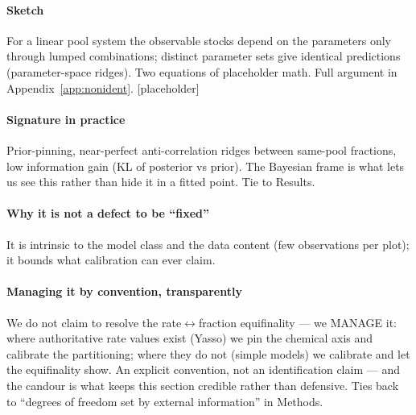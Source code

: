 \documentclass[11pt]{article}
\begin{document}
\paragraph{Sketch}
For a linear pool system the observable stocks depend on the parameters only
through lumped combinations; distinct parameter sets give identical
predictions (parameter-space ridges). Two equations of placeholder math.
Full argument in Appendix~\ref{app:nonident}. [placeholder]

\paragraph{Signature in practice}
Prior-pinning, near-perfect anti-correlation ridges between same-pool
fractions, low information gain (KL of posterior vs prior). The Bayesian frame
is what lets us see this rather than hide it in a fitted point. Tie to Results.

\paragraph{Why it is not a defect to be ``fixed''}
It is intrinsic to the model class and the data content (few observations per
plot); it bounds what calibration can ever claim.

\paragraph{Managing it by convention, transparently}
We do not claim to resolve the rate$\leftrightarrow$fraction equifinality --- we
MANAGE it: where authoritative rate values exist (Yasso) we pin the chemical axis
and calibrate the partitioning; where they do not (simple models) we calibrate and
let the equifinality show. An explicit convention, not an identification claim ---
and the candour is what keeps this section credible rather than defensive. Ties
back to ``degrees of freedom set by external information'' in Methods.
\end{document}
